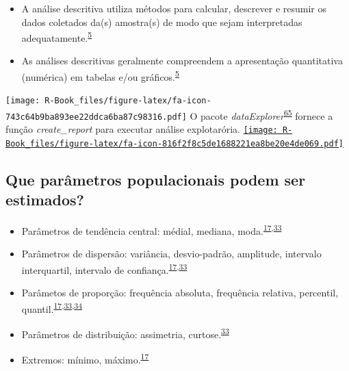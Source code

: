 \documentclass[
]{book}
\begin{document}
\begin{itemize}
\item
  A análise descritiva utiliza métodos para calcular, descrever e resumir os dados coletados da(s) amostra(s) de modo que sejam interpretadas adequatamente.\textsuperscript{\protect\hyperlink{ref-vetter2017}{5}}
\item
  As análises descritivas geralmente compreendem a apresentação quantitativa (numérica) em tabelas e/ou gráficos.\textsuperscript{\protect\hyperlink{ref-vetter2017}{5}}
\end{itemize}

\texttt{[image: R-Book\_files/figure-latex/fa-icon-743c64b9ba893ee22ddca6ba87c98316.pdf]} O pacote \emph{dataExplorer}\textsuperscript{\protect\hyperlink{ref-DataExplorer}{65}} fornece a função \emph{create\_report} para executar análise explotarória. \href{https://cran.r-project.org/web/packages/DataExplorer/index.html}{\texttt{[image: R-Book\_files/figure-latex/fa-icon-816f2f8c5de1688221ea8be20e4de069.pdf]}}

\hypertarget{que-paruxe2metros-populacionais-podem-ser-estimados}{%
\subsection{Que parâmetros populacionais podem ser estimados?}\label{que-paruxe2metros-populacionais-podem-ser-estimados}}

\begin{itemize}
\item
  Parâmetros de tendência central: médial, mediana, moda.\textsuperscript{\protect\hyperlink{ref-Ali2016}{17},\protect\hyperlink{ref-kanji2006}{33}}
\item
  Parâmetros de dispersão: variância, desvio-padrão, amplitude, intervalo interquartil, intervalo de confiança.\textsuperscript{\protect\hyperlink{ref-Ali2016}{17},\protect\hyperlink{ref-kanji2006}{33}}
\item
  Parâmetos de proporção: frequência absoluta, frequência relativa, percentil, quantil.\textsuperscript{\protect\hyperlink{ref-Ali2016}{17},\protect\hyperlink{ref-kanji2006}{33},\protect\hyperlink{ref-Altman1994}{34}}
\item
  Parâmetros de distribuição: assimetria, curtose.\textsuperscript{\protect\hyperlink{ref-kanji2006}{33}}
\item
  Extremos: mínimo, máximo.\textsuperscript{\protect\hyperlink{ref-Ali2016}{17}}
\end{itemize}
\end{document}
